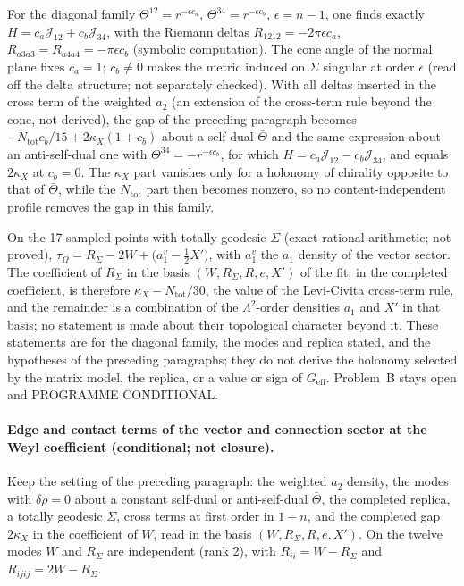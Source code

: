 For the diagonal family \(\Theta^{12}=r^{-\epsilon c_a}\), \(\Theta^{34}=r^{-\epsilon c_b}\), \(\epsilon=n-1\), one finds exactly \(H=c_a\mathcal J_{12}+c_b\mathcal J_{34}\), with the Riemann deltas \(R_{1212}=-2\pi\epsilon c_a\), \(R_{a3a3}=R_{a4a4}=-\pi\epsilon c_b\) (symbolic computation). The cone angle of the normal plane fixes \(c_a=1\); \(c_b\neq0\) makes the metric induced on \(\Sigma\) singular at order \(\epsilon\) (read off the delta structure; not separately checked). With all deltas inserted in the cross term of the weighted \(a_2\) (an extension of the cross-term rule beyond the cone, not derived), the gap of the preceding paragraph becomes \(-N_{\mathrm{tot}}c_b/15+2\kappa_X(1+c_b)\) about a self-dual \(\bar\Theta\) and the same expression about an anti-self-dual one with \(\Theta^{34}=-r^{-\epsilon c_b}\), for which \(H=c_a\mathcal J_{12}-c_b\mathcal J_{34}\), and equals \(2\kappa_X\) at \(c_b=0\). The \(\kappa_X\) part vanishes only for a holonomy of chirality opposite to that of \(\bar\Theta\), while the \(N_{\mathrm{tot}}\) part then becomes nonzero, so no content-independent profile removes the gap in this family.

On the 17 sampled points with totally geodesic \(\Sigma\) (exact rational arithmetic; not proved), \(\tau_\Omega=R_\Sigma-2W+\bigl(a_1^{v}-\tfrac12X'\bigr)\), with \(a_1^{v}\) the \(a_1\) density of the vector sector. The coefficient of \(R_\Sigma\) in the basis \((W,R_\Sigma,R,e,X')\) of the fit, in the completed coefficient, is therefore \(\kappa_X-N_{\mathrm{tot}}/30\), the value of the Levi-Civita cross-term rule, and the remainder is a combination of the \(\Lambda^2\)-order densities \(a_1\) and \(X'\) in that basis; no statement is made about their topological character beyond it. These statements are for the diagonal family, the modes and replica stated, and the hypotheses of the preceding paragraphs; they do not derive the holonomy selected by the matrix model, the replica, or a value or sign of \(G_{\mathrm{eff}}\). Problem~B stays open and PROGRAMME CONDITIONAL.

\paragraph{Edge and contact terms of the vector and connection sector at the Weyl coefficient (conditional; not closure).}
Keep the setting of the preceding paragraph: the weighted \(a_2\) density, the modes with \(\delta\rho=0\) about a constant self-dual or anti-self-dual \(\bar\Theta\), the completed replica, a totally geodesic \(\Sigma\), cross terms at first order in \(1-n\), and the completed gap \(2\kappa_X\) in the coefficient of \(W\), read in the basis \((W,R_\Sigma,R,e,X')\). On the twelve modes \(W\) and \(R_\Sigma\) are independent (rank 2), with \(R_{ii}=W-R_\Sigma\) and \(R_{ijij}=2W-R_\Sigma\).

